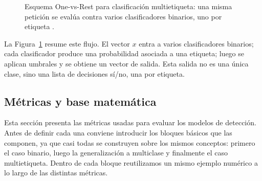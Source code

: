 \documentclass[12pt,oneside]{report}
\begin{document}
\begin{figure}[H]
\centering
{}
\caption{Esquema One-vs-Rest para clasificación multietiqueta: una misma petición se evalúa contra varios clasificadores binarios, uno por etiqueta \cite{tsoumakas_multilabel_overview,rifkin_ova}.}
\label{fig:ovr}
\end{figure}

La Figura~\ref{fig:ovr} resume este flujo. El vector $x$ entra a varios clasificadores binarios; cada clasificador produce una probabilidad asociada a una etiqueta; luego se aplican umbrales y se obtiene un vector de salida. Esta salida no es una única clase, sino una lista de decisiones sí/no, una por etiqueta.

\subsection{Métricas y base matemática}

Esta sección presenta las métricas usadas para evaluar los modelos de
detección. Antes de definir cada una conviene introducir los bloques
básicos que las componen, ya que casi todas se construyen sobre los
mismos conceptos: primero el caso binario, luego la generalización a
multiclase y finalmente el caso multietiqueta. Dentro de cada bloque reutilizamos un mismo ejemplo numérico
a lo largo de las distintas métricas.
\end{document}
